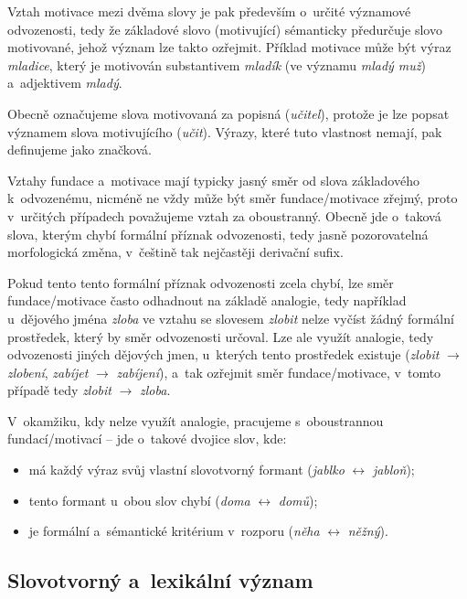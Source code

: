 Vztah motivace mezi dvěma slovy je pak především o~určité významové
odvozenosti, tedy že základové slovo (motivující) sémanticky předurčuje
slovo motivované, jehož význam lze takto ozřejmit.
\parencite[96]{dokulil00} Příklad motivace může být výraz
\emph{mladice}, který je motivován substantivem \emph{mladík} (ve
významu \emph{mladý muž}) a~adjektivem \emph{mladý}.
\parencite[110]{dokulil62}

Obecně označujeme slova motivovaná za popisná (\emph{učitel}), protože
je lze popsat významem slova motivujícího (\emph{učit}). Výrazy, které
tuto vlastnost nemají, pak definujeme jako značková.
\parencite[96]{dokulil00}

Vztahy fundace a~motivace mají typicky jasný směr od slova základového
k~odvozenému, nicméně ne vždy může být směr fundace/motivace zřejmý, proto
v~určitých případech považujeme vztah za oboustranný. Obecně jde
o~taková slova, kterým chybí formální příznak odvozenosti, tedy jasně
pozorovatelná morfologická změna, v~češtině tak nejčastěji derivační
sufix.~\parencite[96]{dokulil00}

Pokud tento tento formální příznak odvozenosti zcela chybí, lze směr
fundace/motivace často odhadnout na základě analogie, tedy například
u~dějového jména \emph{zloba} ve vztahu se slovesem \emph{zlobit} nelze
vyčíst žádný formální prostředek, který by směr odvozenosti určoval. Lze
ale využít analogie, tedy odvozenosti jiných dějových jmen, u~kterých
tento prostředek existuje (\emph{zlobit} $\rightarrow$
\emph{zlobení}, \emph{zabíjet} $\rightarrow$ \emph{zabíjení}), a~tak
ozřejmit směr fundace/motivace, v~tomto případě tedy \emph{zlobit}
$\rightarrow$ \emph{zloba}.~\parencite[96]{dokulil00}

V~okamžiku, kdy nelze využít analogie, pracujeme s~oboustrannou
fundací/motivací -- jde o~takové dvojice slov, kde:

\begin{itemize}
\tightlist
\item
  má každý výraz svůj vlastní slovotvorný formant (\emph{jablko}
  $\leftrightarrow$ \emph{jabloň});
\item
  tento formant u~obou slov chybí (\emph{doma}
  $\leftrightarrow$ \emph{domů});
\item
  je formální a~sémantické kritérium v~rozporu (\emph{něha}
  $\leftrightarrow$ \emph{něžný}).~\parencite[96]{dokulil00}
\end{itemize}

\hypertarget{slovotvornuxfd-a-lexikuxe1lnuxed-vuxfdznam}{%
\subsection{Slovotvorný a~lexikální
význam}\label{slovotvornuxfd-a-lexikuxe1lnuxed-vuxfdznam}}

